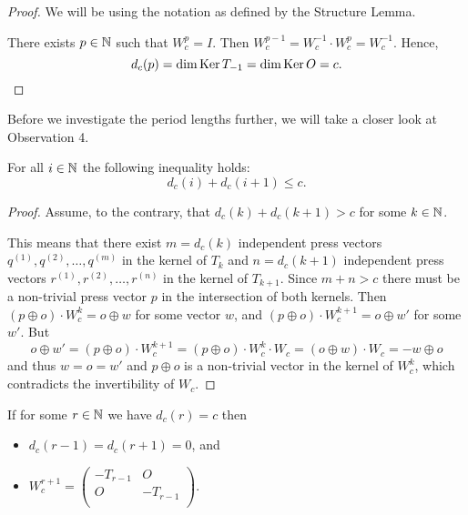 \begin{proof}
  We will be using the notation as defined by the Structure Lemma.

  There exists $p\in\mathbb{N}$ such that $W_{c}^{p} = I$.
  Then $W_{c}^{p-1} = W_{c}^{-1} \cdot W_{c}^{p} = W_{c}^{-1}$.
  Hence,
  \[
  d_{c}(p)
  =
  \dim\operatorname{Ker} T_{-1}
  =
  \dim\operatorname{Ker} O
  = c.
  \]
\end{proof}
Before we investigate the period lengths further,
we will take a closer look at Observation 4.

\begin{theorem}[Observation 4]\label{thm:consec}
  For all $i\in\mathbb{N}$ the following inequality holds:
  \[d_{c}(i) + d_{c}(i+1) \leq c.\]
\end{theorem}
\begin{proof}
  Assume, to the contrary, that $d_{c}(k) + d_{c}(k+1) > c$ for some $k\in\mathbb{N}$.

  This means that there exist $m=d_{c}(k)$ independent press vectors
  $q^{(1)}, q^{(2)}, \ldots, q^{(m)}$ in the kernel of $T_k$ and
  $n = d_{c}(k+1)$ independent press vectors
  $r^{(1)}, r^{(2)}, \ldots, r^{(n)}$ in the kernel of $T_{k+1}$.
  Since $m+n>c$ there must be a non-trivial press vector $p$ in the intersection
  of both kernels. Then $(p\oplus o)\cdot W_c^{k} = o\oplus w$ for
  some vector $w$, and $(p\oplus o)\cdot W_c^{k+1}=o\oplus w'$ for some $w'$.
  But 
  \[ o\oplus w'=(p\oplus o)\cdot W_c^{k+1}=(p\oplus o)\cdot W_c^{k}\cdot W_c=(o\oplus w)\cdot W_c=
   -w\oplus o\]
  and thus $w=o=w'$ and $p\oplus o$ is a non-trivial vector in the kernel
  of $W_c^k$, which contradicts the invertibility of $W_c$.
\end{proof}

\begin{corollary}\label{cor:max}
  If for some $r\in\mathbb{N}$ we have $d_{c}(r) = c$ then
  \begin{itemize}
    \item $d_{c}(r-1) = d_{c}(r+1) = 0$, and
    \item $W_{c}^{r+1} = \left(\begin{smallmatrix} -T_{r-1} & O \\
                                  O & -T_{r-1} \\\end{smallmatrix}\right)$.
  \end{itemize}
\end{corollary}

